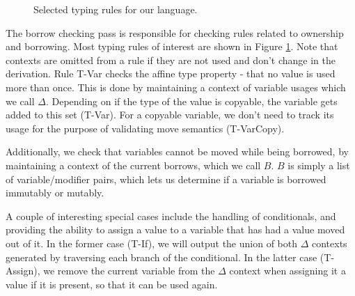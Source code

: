 \documentclass[letterpaper,11pt]{article}
\begin{document}
\begin{figure}
\begin{prooftree}
\end{prooftree}

\begin{prooftree}
\end{prooftree}

    \caption{Selected typing rules for our language.}
    \label{borrowrules}
\end{figure}

The borrow checking pass is responsible for checking rules related to ownership
and borrowing. Most typing rules of interest are shown in Figure \ref{borrowrules}. Note that
contexts are omitted from a rule if they are not used and don't change in the derivation.
Rule T-Var checks the affine type property - that no value is used more than once.
This is done by maintaining a context of variable usages which we call $\Delta$. Depending on if the type
of the value is copyable, the variable gets added to this set (T-Var). For a copyable variable,
we don't need to track its usage for the purpose of validating move semantics (T-VarCopy).

Additionally, we check that variables cannot be moved while being borrowed, by
maintaining a context of the current borrows, which we call $B$. $B$ is simply a list of variable/modifier
pairs, which lets us determine if a variable is borrowed immutably or mutably.

A couple of interesting special cases include the handling of conditionals,
and providing the ability to assign a value to a variable that has had a value
moved out of it. In the former case (T-If), we will output the union of both $\Delta$
contexts generated by traversing each branch of the conditional. In the latter case (T-Assign),
we remove the current variable from the $\Delta$ context when assigning it a value
if it is present, so that it can be used again.
\end{document}
